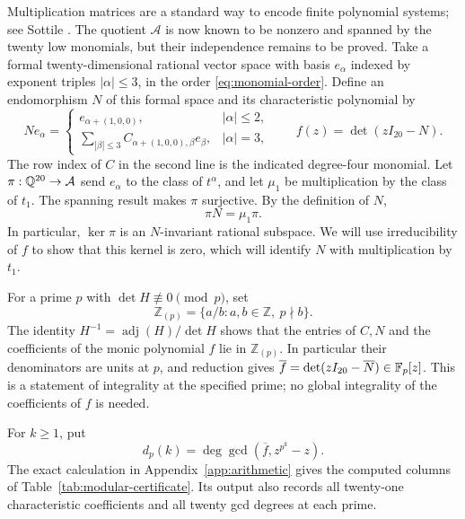 Multiplication matrices are a standard way to encode finite polynomial
systems; see Sottile \cite[Section 2.3]{Sottile2001}.  The quotient
$\mathcal A$ is now known to be nonzero and spanned by the
twenty low monomials, but their independence remains to be proved.
Take a formal twenty-dimensional rational vector space with basis
$e_\alpha$ indexed by exponent triples $|\alpha|\leq3$, in the order
\eqref{eq:monomial-order}.  Define an endomorphism $N$ of this formal
space and its characteristic polynomial by
\begin{equation}
 Ne_\alpha=
 \begin{cases}
 e_{\alpha+(1,0,0)},&|\alpha|\leq2,\\[1mm]
 \displaystyle\sum_{|\beta|\leq3}
 C_{\alpha+(1,0,0),\beta}e_\beta,&|\alpha|=3,
 \end{cases}
 \qquad f(z)=\det(zI_{20}-N).
 \label{eq:N}
\end{equation}
The row index of $C$ in the second line is the indicated degree-four
monomial.  Let $\pi:\mathbb Q^{20}\to\mathcal A$ send $e_\alpha$ to the class of
$t^\alpha$, and let $\mu_1$ be multiplication by the class of $t_1$.
The spanning result makes $\pi$ surjective.  By the definition of $N$,
\begin{equation}
 \pi N=\mu_1\pi.
 \label{eq:intertwining}
\end{equation}
In particular, $\ker\pi$ is an $N$-invariant rational subspace.
We will use irreducibility of $f$ to show that this kernel is zero,
which will identify $N$ with multiplication by $t_1$.

For a prime $p$ with $\det H\not\equiv0\pmod p$, set
\[
 \mathbb Z_{(p)}=\{a/b:a,b\in\mathbb Z,\ p\nmid b\}.
\]
The identity $H^{-1}=\operatorname{adj}(H)/\det H$ shows that the entries
of $C,N$ and the coefficients of the monic polynomial $f$ lie in
$\mathbb Z_{(p)}$.  In particular their denominators are units at $p$,
and reduction gives
$\overline f=\det(zI_{20}-\overline N)\in\mathbb F_p[z]$.  This is a statement
of integrality at the specified prime; no global integrality of the
coefficients of $f$ is needed.

For $k\geq1$, put
\[
 d_p(k)=\deg\gcd(\overline f,z^{p^k}-z).
\]
The exact calculation in Appendix~\ref{app:arithmetic} gives the computed
columns of Table~\ref{tab:modular-certificate}.  Its output also records all twenty-one characteristic
coefficients and all twenty gcd degrees at each prime.


